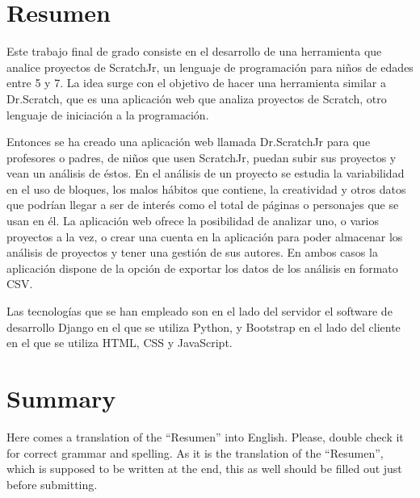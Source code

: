 \documentclass[a4paper, 12pt]{book}
\begin{document}

\chapter*{Resumen}

Este trabajo final de grado consiste en el desarrollo de una herramienta que analice proyectos de ScratchJr, un lenguaje de programación para niños de edades entre 5 y 7.  
La idea surge con el objetivo de hacer una herramienta similar a Dr.Scratch, que es una aplicación web que analiza proyectos de Scratch, otro lenguaje de iniciación a la programación. 

\vspace{5mm}

Entonces se ha creado una aplicación web llamada Dr.ScratchJr para que profesores o padres, de niños que usen ScratchJr, puedan subir sus proyectos y vean un análisis de éstos.
En el análisis de un proyecto se estudia la variabilidad en el uso de bloques, los malos hábitos que contiene, la creatividad y otros datos que podrían llegar a ser de interés como el total de páginas o personajes que se usan en él. 
La aplicación web ofrece la posibilidad de analizar uno, o varios proyectos a la vez, o crear una cuenta en la aplicación para poder almacenar los análisis de proyectos y tener una gestión de sus autores. 
En ambos casos la aplicación dispone de la opción de exportar los datos de los análisis en formato CSV.

\vspace{5mm}

Las tecnologías que se han empleado son en el lado del servidor el software de desarrollo Django en el que se utiliza Python, y Bootstrap en el lado del cliente en el que se utiliza HTML, CSS y JavaScript.


\chapter*{Summary}

Here comes a translation of the ``Resumen'' into English. 
Please, double check it for correct grammar and spelling.
As it is the translation of the ``Resumen'', which is supposed to be written at the end, this as well should be filled out just before submitting.
\end{document}
